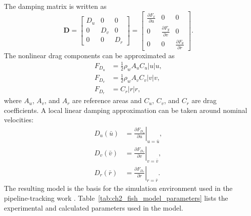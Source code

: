 \documentclass{uhcoethesis}
\begin{document}
The damping matrix is written as
\begin{equation}
    \mathbf{D} =
    \begin{bmatrix}
        D_u & 0 & 0 \\
        0 & D_v & 0 \\
        0 & 0 & D_r
    \end{bmatrix}
    =
    \begin{bmatrix}
        \frac{\partial F_x}{\partial u} & 0 & 0 \\
        0 & \frac{\partial F_y}{\partial v} & 0 \\
        0 & 0 & \frac{\partial F_{\theta}}{\partial r}
    \end{bmatrix}.
    \label{eq:ch2_damping_matrix}
\end{equation}
The nonlinear drag components can be approximated as
\begin{equation}
    \begin{aligned}
        F_{D_u} &= \frac{1}{2}\rho_w A_u C_u |u|u, \\
        F_{D_v} &= \frac{1}{2}\rho_w A_v C_v |v|v, \\
        F_{D_r} &= C_r |r|r,
    \end{aligned}
    \label{eq:ch2_drag_forces}
\end{equation}
where $A_u$, $A_v$, and $A_r$ are reference areas and $C_u$, $C_v$, and $C_r$ are drag coefficients. A local linear damping approximation can be taken around nominal velocities:
\begin{equation}
    \begin{aligned}
        D_u(\bar{u}) &=
        \left.\frac{\partial F_{D_u}}{\partial u}\right|_{u=\bar{u}}, \\
        D_v(\bar{v}) &=
        \left.\frac{\partial F_{D_v}}{\partial v}\right|_{v=\bar{v}}, \\
        D_r(\bar{r}) &=
        \left.\frac{\partial F_{D_r}}{\partial r}\right|_{r=\bar{r}}.
    \end{aligned}
    \label{eq:ch2_linear_damping}
\end{equation}
The resulting model is the basis for the simulation environment used in the pipeline-tracking work \cite{Masood2025Pipeline}. Table~\ref{tab:ch2_fish_model_parameters} lists the experimental and calculated parameters used in the model.
\end{document}
